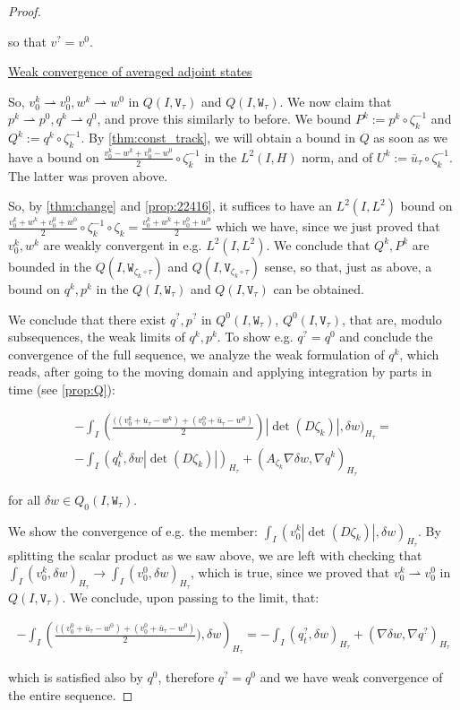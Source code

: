 \documentclass[english,a4paper,10pt,oneside]{scrbook}	%
\theoremstyle{break}
\newenvironment{mproof}[1][\proofname]{%
  \begin{proof}[#1]$ $\par\nobreak\ignorespaces
}{%
  \end{proof}
}
\renewcommand*{\proofname}{Proof}
\theoremstyle{remark}
\newcommand{\ds}{\displaystyle}
\newcommand{\weakc}{\rightharpoonup}
\newcommand{\tw}[1]{\texttt{#1}}
\begin{document}
\begin{mproof}
so that $v^?=v^0$.

\underline{Weak convergence of averaged adjoint states}

So, $v_0^k \weakc v_0^0, w^k\weakc w^0$ in $Q(I,\tw{V}_\tau)$ and $Q(I,\tw{W}_\tau)$.
We now claim that $p^k \weakc p^0, q^k\weakc q^0$, and prove this similarly to before. We bound $P^k:=p^k\circ \zeta_k^{-1}$ and $Q^k:=q^k\circ \zeta_k^{-1}$.
By \cref{thm:const_track}, we will obtain a bound in $Q$  as soon as we have a bound on $\ds \frac{v_0^k-w^k+v_0^0-w^0}{2}\circ \zeta_k^{-1}$ in the $L^2(I,H)$ norm, and of $U^k:=\bar{u}_\tau\circ \zeta_k^{-1}$. The latter was proven above.

So, by \cref{thm:change} and \cref{prop:22416}, it suffices to have an $L^2(I,L^2)$ bound on $\ds \frac{v_0^k+w^k+v_0^0+w^0}{2}\circ \zeta_k^{-1}\circ \zeta_k = \frac{v_0^k+w^k+v_0^0+w^0}{2}$ which we have, since we just proved that $v_0^k, w^k$ are weakly convergent in e.g. $L^2(I,L^2)$.
We conclude that $Q^k,P^k$ are bounded in the $Q(I,\tw{W}_{\zeta_k\circ \tau})$ and $Q(I,\tw{V}_{\zeta_k\circ \tau})$ sense, so that, just as above,  a bound on $q^k, p^k$ in the $Q(I,\tw{W}_{ \tau})$ and $Q(I,\tw{V}_{ \tau})$ can be obtained.

We conclude that there exist $q^?, p^?$ in $Q^0(I,\tw{W}_{ \tau})$, $Q^0(I,\tw{V}_{ \tau})$, that are, modulo subsequences, the weak limits of $q^k, p^k$.
To show e.g. $q^?=q^0$ and conclude the convergence of the full sequence, we analyze the weak formulation of $q^k$, which reads, after going to the moving domain and applying integration by parts in time (see \cref{prop:Q}):

\begin{align*}
-\int_I \left (\frac{((v_0^k+\bar{u}_\tau - w^k)+(v_0^0+\bar{u}_\tau - w^0)}{2}\right )|\det(D\zeta_k)|,\delta w)_{H_\tau}=\\
-\int_I (  q^k_t ,   \delta w |\det(D\zeta_k)|)_{H_\tau}+ (A_{\zeta_k}\nabla \delta w, \nabla q^k)_{H_\tau}
\end{align*}

for all $\delta w \in Q_0(I,\tw{W}_{ \tau})$.

We show the convergence of e.g. the member: $\ds\int_I( v_0^k|\det(D\zeta_k)|,\delta w)_{H_\tau}$. By splitting the scalar product as we saw above, we are left with checking that $\ds\int_I (v_0^k,\delta w)_{H_\tau}\rightarrow  \int_I (v_0^0,\delta w)_{H_\tau}$, which is true, since we proved that $v_0^k \weakc v_0^0$ in $Q(I,\tw{V}_\tau)$. We conclude, upon passing to the limit, that:

\begin{align*}
-\int_I \left (\frac{((v_0^0+\bar{u}_\tau - w^0)+(v_0^0+\bar{u}_\tau - w^0)}{2} ),\delta w\right)_{H_\tau} = 
-\int_I (  q^?_t ,   \delta w )_{H_\tau}+ (\nabla \delta w, \nabla q^?)_{H_\tau}
\end{align*}

which is satisfied also by $q^0$, therefore $q^? = q^0$ and we have weak convergence of the entire sequence.
\end{mproof}
\end{document}
